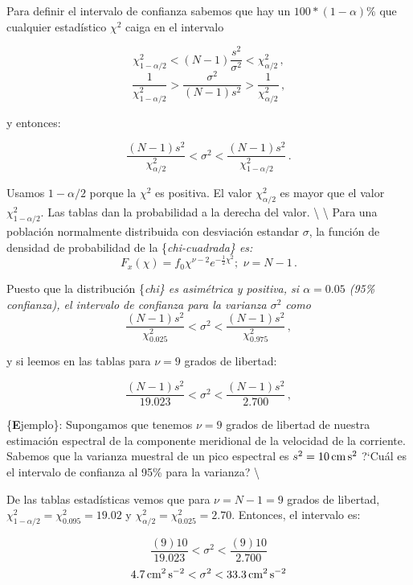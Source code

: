 \documentclass[
]{agujournal2019}
\begin{document}
\vspace{0.25cm}

Para definir el intervalo de confianza sabemos que hay un
\(100*(1-\alpha)\%\) que cualquier estadístico \(\chi^2\) caiga en el
intervalo

\[\chi^2_{1-\alpha/2}<(N-1)\frac{s^2}{\sigma^2}<\chi^2_{\alpha/2}\,,\]
\[\frac{1}{\chi^2_{1-\alpha/2}}>\frac{\sigma^2}{(N-1)s^2}>\frac{1}{\chi^2_{\alpha/2}}\,,\]

y entonces:

\[\frac{(N-1)s^2}{\chi^2_{\alpha/2}}<\sigma^2<\frac{(N-1)s^2}{\chi^2_{1-\alpha/2}}\,.\]

\begin{center}
\end{center}

Usamos \(1-{\alpha/2}\) porque la \(\chi^2\) es positiva. El valor
\(\chi^2_{\alpha/2}\) es mayor que el valor \(\chi^2_{1-\alpha/2}\). Las
tablas dan la probabilidad a la derecha del valor. \textbackslash{}
\textbackslash{} Para una población normalmente distribuida con
desviación estandar \(\sigma\), la función de densidad de probabilidad
de la \{\it chi-cuadrada\} es:
\[F_x(\chi)=f_0\chi^{\nu-2}e^{-\frac{1}{2}\chi^2};\,\,\nu=N-1\,.\]

Puesto que la distribución \{\it chi\} es asimétrica y positiva, si
\(\alpha=0.05\) (95\% confianza), el intervalo de confianza para la
varianza \(\sigma^2\) como
\[\frac{(N-1)s^2}{\chi^2_{0.025}}<\sigma^2<\frac{(N-1)s^2}{\chi^2_{0.975}}\,,\]

y si leemos en las tablas para \(\nu=9\) grados de libertad:

\[\frac{(N-1)s^2}{19.023}<\sigma^2<\frac{(N-1)s^2}{2.700}\,,\]

\{\textbf Ejemplo\}: Supongamos que tenemos \(\nu=9\) grados de libertad
de nuestra estimación espectral de la componente meridional de la
velocidad de la corriente. Sabemos que la varianza muestral de un pico
espectral es \(s^2=10\,{\rm cm}\,{\rm s}^2\) ?{}`Cuál es el intervalo de
confianza al 95\% para la varianza? \textbackslash{}

De las tablas estadísticas vemos que para \(\nu=N-1=9\) grados de
libertad, \(\chi^2_{1-\alpha/2}=\chi^2_{0.095}=19.02\) y
\(\chi^2_{\alpha/2}=\chi^2_{0.025}=2.70\). Entonces, el intervalo es:

\[\frac{(9)10}{19.023}<\sigma^2<\frac{(9)10}{2.700}\]
\[4.7\,{\rm cm}^2\,{\rm s}^{-2}<\sigma^2<33.3\,{\rm cm}^2\,{\rm s}^{-2}\]
\end{document}
